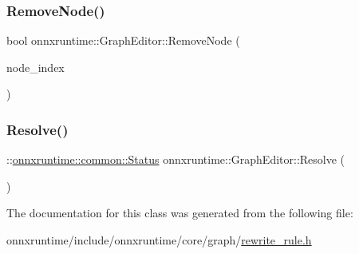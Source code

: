 \mbox{\label{classonnxruntime_1_1GraphEditor_a01082a28ba40bb25ae08e750993d6b76}} 
\subsubsection{\texorpdfstring{Remove\+Node()}{RemoveNode()}}
{\footnotesize\ttfamily bool onnxruntime\+::\+Graph\+Editor\+::\+Remove\+Node (\begin{DoxyParamCaption}\item[{\mbox{\hyperlink{namespaceonnxruntime_af8773b5c12b5d8fd9292eb2e268df760}{Node\+Index}}}]{node\+\_\+index }\end{DoxyParamCaption})\hspace{0.3cm}{\ttfamily [inline]}}

\mbox{\label{classonnxruntime_1_1GraphEditor_a801fa93d7efaff4d190e7328df390975}} 
\subsubsection{\texorpdfstring{Resolve()}{Resolve()}}
{\footnotesize\ttfamily \+::\mbox{\hyperlink{classonnxruntime_1_1common_1_1Status}{onnxruntime\+::common\+::\+Status}} onnxruntime\+::\+Graph\+Editor\+::\+Resolve (\begin{DoxyParamCaption}{ }\end{DoxyParamCaption})\hspace{0.3cm}{\ttfamily [inline]}}



The documentation for this class was generated from the following file\+:\begin{DoxyCompactItemize}
\item 
onnxruntime/include/onnxruntime/core/graph/\mbox{\hyperlink{rewrite__rule_8h}{rewrite\+\_\+rule.\+h}}\end{DoxyCompactItemize}

